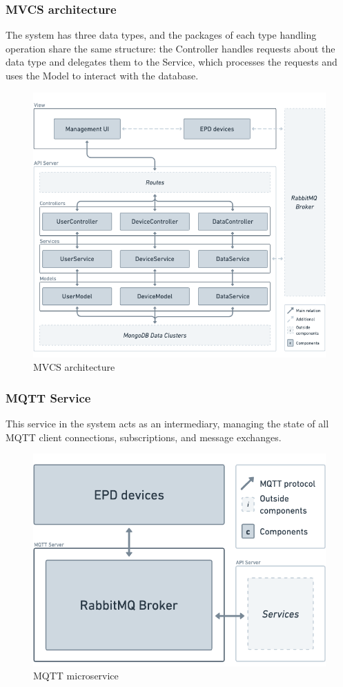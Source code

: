 \documentclass[../Main.tex]{subfiles}
\begin{document}
\subsubsection{MVCS architecture}
The system has three data types, and the packages of each type handling operation share the same structure: the Controller handles requests about the data type and delegates them to the Service, which processes the requests and uses the Model to interact with the database.
\begin{figure}[H]
    \centering
    \includegraphics[scale=0.6]{doc/imgs/api-server.png}
    \caption{MVCS architecture}
    \label{fig:Fig2}
\end{figure}

\subsubsection{MQTT Service}
This service in the system acts as an intermediary, managing the state of all MQTT client connections, subscriptions, and message exchanges.
\begin{figure}[H]
    \centering
    \includegraphics[scale=0.3]{doc/imgs/mqtt-server.png}
    \caption{MQTT microservice}
    \label{fig:Fig3}
\end{figure}
\end{document}
